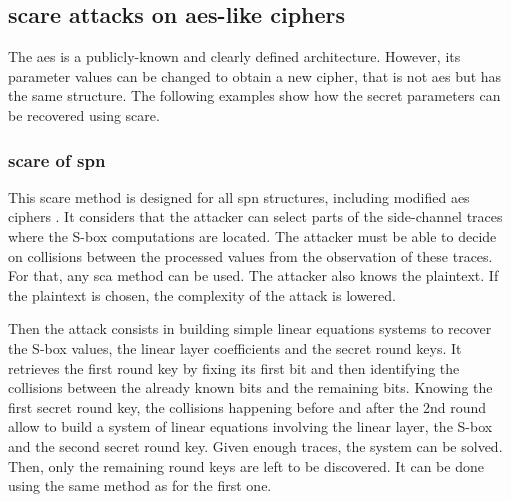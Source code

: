 \documentclass[11pt]{sdm}
\begin{document}



\subsection{\gls{scare} attacks on \gls{aes}-like ciphers}

The \acrlong{aes} is a publicly-known and clearly defined architecture. 
However, its parameter values can be changed to obtain a new cipher, that is not \gls{aes} but has the same structure.
The following examples show how the secret parameters can be recovered using \gls{scare}.

\subsubsection{\gls{scare} of \gls{spn}}
\label{scare_of_spns}

This \gls{scare} method is designed for all \gls{spn} structures, including modified \gls{aes} ciphers \parencite{Rivain_Roche_2013}.
It considers that the attacker can select parts of the side-channel traces where the S-box computations are located.
The attacker must be able to decide on collisions between the processed values from the observation of these traces.
For that, any \gls{sca} method can be used.
The attacker also knows the plaintext.
If the plaintext is chosen, the complexity of the attack is lowered.

Then the attack consists in building simple linear equations systems to recover the S-box values, the linear layer coefficients and the secret round keys.
It retrieves the first round key by fixing its first bit and then identifying the collisions between the already known bits and the remaining bits.
Knowing the first secret round key, the collisions happening before and after the 2nd round allow to build a system of linear equations involving the linear layer, the S-box and the second secret round key.
Given enough traces, the system can be solved.
Then, only the remaining round keys are left to be discovered.
It can be done using the same method as for the first one.
\end{document}
